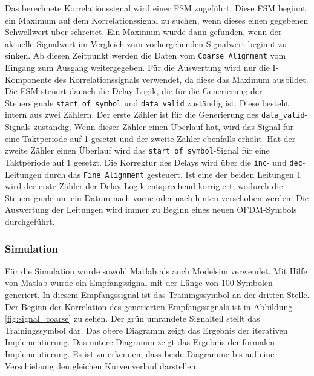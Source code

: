 Das berechnete Korrelationssignal wird einer FSM zugeführt. Diese FSM beginnt ein Maximum auf dem Korrelationssignal zu suchen, wenn dieses einen gegebenen Schwellwert über-schreitet. Ein Maximum wurde dann gefunden, wenn der aktuelle Signalwert im Vergleich zum vorhergehenden Signalwert beginnt zu sinken. Ab diesen Zeitpunkt werden die Daten vom \texttt{Coarse Alignment} vom Eingang zum Ausgang weitergegeben. Für die Auswertung wird nur die I-Komponente des Korrelationssignals verwendet, da diese das Maximum ausbildet. Die FSM steuert danach die Delay-Logik, die für die Generierung der Steuersignale \texttt{start\_of\_symbol} und \texttt{data\_valid} zuständig ist. Diese besteht intern aus zwei Zählern. Der erste Zähler ist für die Generierung des \texttt{data\_valid}-Signals zuständig. Wenn dieser Zähler einen Überlauf hat, wird das Signal für eine Taktperiode auf 1 gesetzt und der zweite Zähler ebenfalls erhöht. Hat der zweite Zähler einen Überlauf wird das \texttt{start\_of\_symbol}-Signal für eine Taktperiode auf 1 gesetzt. Die Korrektur des Delays wird über die \texttt{inc}- und \texttt{dec}-Leitungen durch das \texttt{Fine Alignment} gesteuert. Ist eine der beiden Leitungen 1 wird der erste Zähler der Delay-Logik entsprechend korrigiert, wodurch die Steuersignale um ein Datum nach vorne oder nach hinten verschoben werden. Die Auswertung der Leitungen wird immer zu Beginn eines neuen OFDM-Symbols durchgeführt.

\subsubsection{Simulation}
Für die Simulation wurde sowohl Matlab als auch Modelsim verwendet. Mit Hilfe von Matlab wurde ein Empfangssignal mit der Länge von 100 Symbolen generiert. In diesem Empfangssignal ist das Trainingssymbol an der dritten Stelle. Der Beginn der Korrelation des generierten Empfangssignals ist in Abbildung \ref{fig:signal_coarse} zu sehen. Der grün umrandete Signalteil stellt das Trainingssymbol dar. Das obere Diagramm zeigt das Ergebnis der iterativen Implementierung. Das untere Diagramm zeigt das Ergebnis der formalen Implementierung. Es ist zu erkennen, dass beide Diagramme bis auf eine Verschiebung den gleichen Kurvenverlauf darstellen.

\begin{center}
\end{center}


